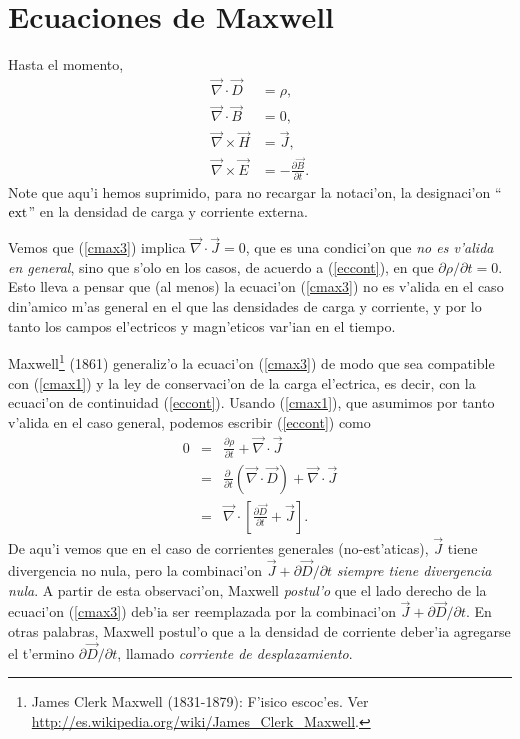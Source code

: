\section{Ecuaciones de Maxwell}
Hasta el momento,
\begin{align}
\vec\nabla\cdot\vec{D} & =\rho ,\label{cmax1}\\
\vec\nabla\cdot\vec{B}  & =0 ,\label{cmax2}\\
\vec\nabla\times\vec{H}  & =\vec{J} ,\label{cmax3}\\
\vec\nabla\times\vec{E}  & =-\frac{\partial\vec{B}}{\partial t} .\label{cmax4}
\end{align}
Note que aqu'i hemos suprimido, para no recargar la notaci'on, la designaci'on ``${\rm ext}$'' en la densidad de carga y corriente externa.

Vemos que (\ref{cmax3}) implica $\vec\nabla\cdot\vec{J}=0$, que es una condici'on que \textit{no es v'alida en general}, sino que s'olo en los casos, de acuerdo a (\ref{eccont}), en que ${\partial\rho}/{\partial t}=0$. Esto lleva a pensar que (al menos) la ecuaci'on (\ref{cmax3}) no es v'alida en el caso din'amico m'as general en el que las densidades de carga y corriente, y por lo tanto los campos el'ectricos y magn'eticos var'ian en el tiempo.

Maxwell\footnote{James Clerk Maxwell (1831-1879): F'isico escoc'es. Ver \url{http://es.wikipedia.org/wiki/James_Clerk_Maxwell}.} (1861) generaliz'o la ecuaci'on (\ref{cmax3}) de modo que sea
compatible con (\ref{cmax1}) y la ley de conservaci'on de la carga el'ectrica,
es decir, con la ecuaci'on de continuidad (\ref{eccont}). Usando (\ref{cmax1}), que asumimos por tanto v'alida en el caso general, podemos escribir (\ref{eccont}) como
\begin{eqnarray}
 0&=&\frac{\partial\rho}{\partial t}+\vec{\nabla}\cdot\vec{J}\\
&=& \frac{\partial\ }{\partial
t}\left(\vec\nabla\cdot\vec{D}\right)+\vec{\nabla}\cdot\vec{J}\\
&=& \vec\nabla\cdot\left[\frac{\partial\vec{D}}{\partial t}
+\vec{J}\right].
\end{eqnarray}
De aqu'i vemos que en el caso de corrientes generales (no-est'aticas),
$\vec{J}$ tiene divergencia no nula, pero la combinaci'on
$\vec{J}+{\partial\vec{D}}/{\partial t}$ \textit{siempre tiene divergencia nula}.
A partir de esta observaci'on, Maxwell \textit{postul'o} que el lado derecho de la
ecuaci'on (\ref{cmax3}) deb'ia ser reemplazada por la combinaci'on
$\vec{J}+{\partial\vec{D}}/{\partial t}$. En otras palabras, Maxwell
postul'o que a la densidad de corriente deber'ia agregarse el t'ermino
${\partial\vec{D}}/{\partial t}$, llamado \textit{corriente de
desplazamiento}.

